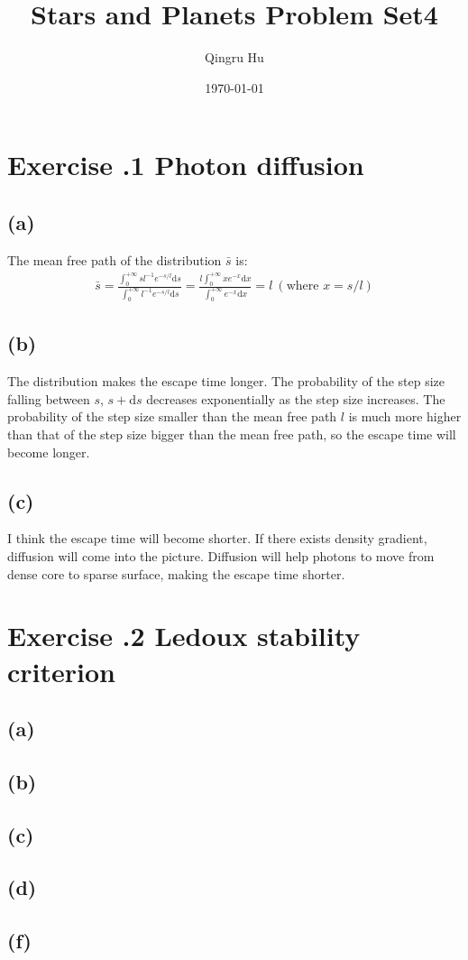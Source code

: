 \documentclass[a4paper,12pt]{article}
\title{\textbf{Stars and Planets Problem Set4}}
\author{Qingru Hu}
\date{\today}
\renewcommand{\d}{\mathrm{d}}
\begin{document}
\maketitle
\section*{\textbf{Exercise \uppercase\expandafter{}.1 Photon diffusion}}
\subsection*{(a)}
The mean free path of the distribution $\bar{s}$ is:
\begin{align*}
    \bar{s} = \frac{\int_{0}^{+\infty} s l^{-1} e^{-s/l} \d s}{\int_{0}^{+\infty} l^{-1} e^{-s/l} \d s} = 
    \frac{l \int_{0}^{+\infty} x e^{-x} \d x}{\int_{0}^{+\infty} e^{-x} \d x}
    = l \ (\text{where } x = s/l)
\end{align*}


\subsection*{(b)}
The distribution makes the escape time longer. The probability of the step size falling between $s$, $s+\d s$ 
decreases exponentially as the step size increases. The probability of the step size smaller than the mean free path $l$
is much more higher than that of the step size bigger than the mean free path, so the escape time will become longer.

\subsection*{(c)}
I think the escape time will become shorter. If there exists density gradient, diffusion will come into the picture.
Diffusion will help photons to move from dense core to sparse surface, making the escape time shorter.



\section*{\textbf{Exercise \uppercase\expandafter{}.2 Ledoux stability criterion}}
\subsection*{(a)}

\subsection*{(b)}


\subsection*{(c)}


\subsection*{(d)}


\subsection*{(f)}
\end{document}
